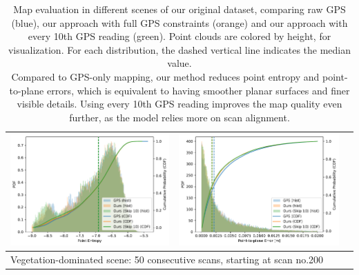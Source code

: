 \begin{table}[h]
{\begin{tabular}{ccc}
            \includegraphics[width=0.31\linewidth]{images/map_eval/entropy_gps_ours_skip-200--50.pdf}  &
            \includegraphics[width=0.31\linewidth]{images/map_eval/p2plane_gps_ours_skip-200--50.pdf}                                                  \\
            \hline
            \multicolumn{3}{l}{Vegetation-dominated scene: 50 consecutive scans, starting at scan no.200}                                              \\
            \hline
        \end{tabular}
    }

    \caption{Map evaluation in different scenes of our original dataset, comparing raw GPS (blue), our approach with full GPS constraints (orange) and our approach with every 10th GPS reading (green). Point clouds are colored by height, for visualization. For each distribution, the dashed vertical line indicates the median value.\\Compared to GPS-only mapping, our method reduces point entropy and point-to-plane errors, which is equivalent to having smoother planar surfaces and finer visible details. Using every 10th GPS reading improves the map quality even further, as the model relies more on scan alignment.}
    \label{tab:map-eval}
\end{table}


